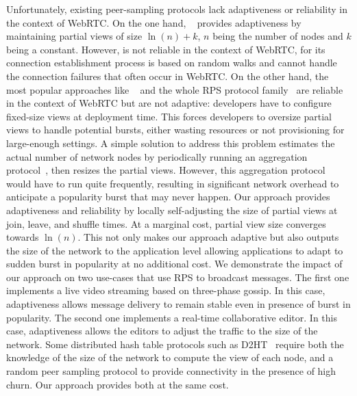 Unfortunately, existing peer-sampling protocols lack adaptiveness or reliability
in the context of WebRTC. On the one hand,
\SCAMP~\cite{ganesh2001scamp,ganesh2003peer} provides adaptiveness by
maintaining partial views of size $\ln(n)+k$, $n$ being the number of nodes and
$k$ being a constant. However, \SCAMP is not reliable in the context of WebRTC,
for its connection establishment process is based on random walks and cannot
handle the connection failures that often occur in WebRTC. On the other hand,
the most popular approaches like \CYCLON~\cite{voulgaris2005cyclon} and the
whole RPS protocol family~\cite{jelasity2007gossip} are reliable in the context
of WebRTC but are not adaptive: developers have to configure fixed-size views at
deployment time. This forces developers to oversize partial views to handle
potential bursts, either wasting resources or not provisioning for large-enough
settings. A simple solution to address this problem estimates the actual number
of network nodes by periodically running an aggregation
protocol~\cite{montresor2004robust}, then resizes the partial views. However,
this aggregation protocol would have to run quite frequently, resulting in
significant network overhead to anticipate a popularity burst that may never
happen. Our approach provides adaptiveness and reliability by locally
self-adjusting the size of partial views at join, leave, and shuffle times. At a
marginal cost, partial view size converges towards $\ln(n)$. This not only makes
our approach adaptive but also outputs the size of the network to the
application level allowing applications to adapt to sudden burst in popularity
at no additional cost. We demonstrate the impact of our approach on two
use-cases that use RPS to broadcast messages. The first one implements a live
video streaming based on three-phase gossip. In this case, adaptiveness allows
message delivery to remain stable even in presence of burst in popularity. The
second one implements a real-time collaborative editor. In this case,
adaptiveness allows the editors to adjust the traffic to the size of the
network. Some distributed hash table protocols such as D2HT~\cite{bertier-d2ht}
require both the knowledge of the size of the network to compute the view of
each node, and a random peer sampling protocol to provide connectivity in the
presence of high churn. Our approach provides both at the same cost.


